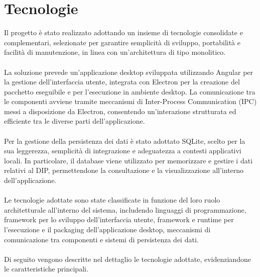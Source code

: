 \documentclass[a4paper,12pt]{article}
\begin{document}
    \section{Tecnologie} {
        Il progetto è stato realizzato adottando un insieme di tecnologie consolidate e complementari, selezionate per garantire semplicità di sviluppo, portabilità e facilità di manutenzione, in linea con un’architettura di tipo monolitico.\\
        \\
        La soluzione prevede un’applicazione desktop sviluppata utilizzando Angular per la gestione dell’interfaccia utente, integrata con Electron per la creazione del pacchetto eseguibile e per l’esecuzione in ambiente desktop. La comunicazione tra le componenti avviene tramite meccanismi di Inter-Process Communication (IPC) messi a disposizione da Electron, consentendo un’interazione strutturata ed efficiente tra le diverse parti dell’applicazione.\\
        \\
        Per la gestione della persistenza dei dati è stato adottato SQLite, scelto per la sua leggerezza, semplicità di integrazione e adeguatezza a contesti applicativi locali. In particolare, il database viene utilizzato per memorizzare e gestire i dati relativi al DIP, permettendone la consultazione e la visualizzazione all’interno dell’applicazione.\\
        \\
        Le tecnologie adottate sono state classificate in funzione del loro ruolo architetturale all’interno del sistema, includendo linguaggi di programmazione, framework per lo sviluppo dell’interfaccia utente, framework e runtime per l’esecuzione e il packaging dell’applicazione desktop, meccanismi di comunicazione tra componenti e sistemi di persistenza dei dati.\\
        \\
        Di seguito vengono descritte nel dettaglio le tecnologie adottate, evidenziandone le caratteristiche principali.

}
\end{document}
